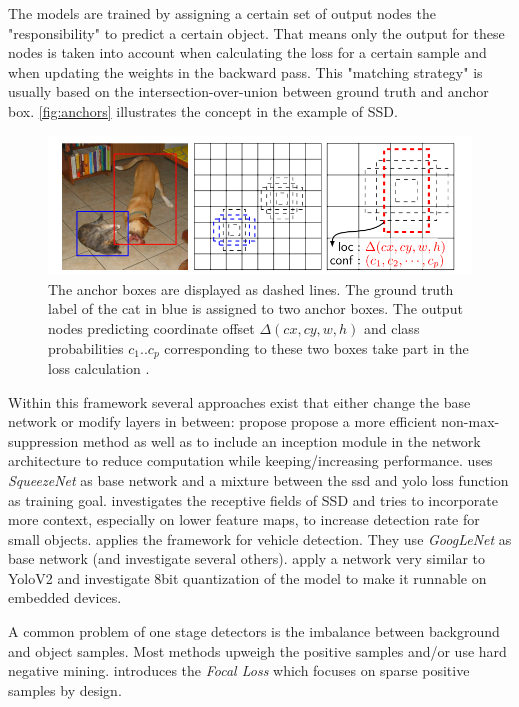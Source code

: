	The models are trained by assigning a certain set of output nodes the "responsibility" to predict a certain object. That means only the output for these nodes is taken into account when calculating the loss for a certain sample and when updating the weights in the backward pass. This "matching strategy" is usually based on the intersection-over-union between ground truth and anchor box. \autoref{fig:anchors} illustrates the concept in the example of SSD.  
	
	\begin{figure}[hbtp]
		
		\centering
		\captionsetup{justification=raggedright,singlelinecheck=false}
		\includegraphics[width=0.8\linewidth]{fig/anchors}
		\caption{The anchor boxes are displayed as dashed lines. The ground truth label of the cat in blue is assigned to two anchor boxes. The output nodes predicting coordinate offset $\Delta(cx, cy, w,h)$ and class probabilities $c_1 .. c_p$ corresponding to these two boxes take part in the loss calculation \cite{Liu}.}
		\label{fig:anchors}
		
	\end{figure}
	
	Within this framework several approaches exist that either change the base network or modify layers in between: \cite{ChengchengNing2017} propose propose a more efficient non-max-suppression method as well as to include an inception module in the network architecture to reduce computation while keeping/increasing performance. \cite{Wu} uses \textit{SqueezeNet} as base network and a mixture between the ssd and yolo loss function as training goal. \cite{Xiang} investigates the receptive fields of SSD and tries to incorporate more context, especially on lower feature maps, to increase detection rate for small objects.\cite{Linb} applies the framework for vehicle detection. They use \textit{GoogLeNet} as base network (and investigate several others).\cite{TripathiSanDiego} apply a network very similar to YoloV2 and investigate 8bit quantization of the model to make it runnable on embedded devices.
	
	A common problem of one stage detectors is the imbalance between background and object samples. Most methods upweigh the positive samples and/or use hard negative mining. \cite{Lin} introduces the \textit{Focal Loss} which focuses on sparse positive samples by design.
	
